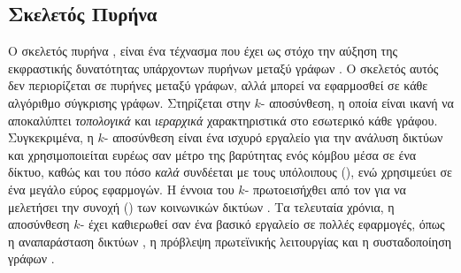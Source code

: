 \subsection{Σκελετός Πυρήνα }
\label{ssec:core}
Ο σκελετός πυρήνα , είναι ένα τέχνασμα που έχει ως στόχο την αύξηση της εκφραστικής δυνατότητας υπάρχοντων πυρήνων μεταξύ γράφων \cite{nikolentzos2018}.
Ο σκελετός αυτός δεν περιορίζεται σε πυρήνες μεταξύ γράφων, αλλά μπορεί να εφαρμοσθεί σε κάθε αλγόριθμο σύγκρισης γράφων.
Στηρίζεται στην $k$- αποσύνθεση, η οποία είναι ικανή να αποκαλύπτει \textit{τοπολογικά} και \textit{ιεραρχικά} χαρακτηριστικά στο εσωτερικό κάθε γράφου.
Συγκεκριμένα, η $k$- αποσύνθεση είναι ένα ισχυρό εργαλείο για την ανάλυση δικτύων και χρησιμοποιείται ευρέως σαν μέτρο της βαρύτητας ενός κόμβου μέσα σε ένα δίκτυο, καθώς και του πόσο \textit{καλά} συνδέεται με τους υπόλοιπους (), ενώ χρησιμεύει σε ένα μεγάλο εύρος εφαρμογών.
Η έννοια του $k$- πρωτοεισήχθει από τον  για να μελετήσει την συνοχή () των κοινωνικών δικτύων \cite{seidman1983network}.
Τα τελευταία χρόνια, η αποσύνθεση $k$- έχει καθιερωθεί σαν ένα βασικό εργαλείο σε πολλές εφαρμογές, όπως η αναπαράσταση δικτύων \cite{alvarez2006large}, η πρόβλεψη πρωτεϊνικής λειτουργίας \cite{wuchty2005peeling} και η συσταδοποίηση γράφων \cite{giatsidis2014corecluster}.

